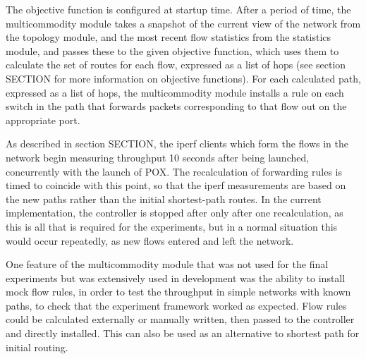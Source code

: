 The objective function is configured at startup time. After a period of time, the multicommodity module takes a snapshot of the current view of the network from the topology module, and the most recent flow statistics from the statistics module, and passes these to the given objective function, which uses them to calculate the set of routes for each flow, expressed as a list of hops (see section SECTION for more information on objective functions). For each calculated path, expressed as a list of hops, the multicommodity module installs a rule on each switch in the path that forwards packets corresponding to that flow out on the appropriate port.

As described in section SECTION, the iperf clients which form the flows in the network begin measuring throughput 10 seconds after being launched, concurrently with the launch of POX. The recalculation of forwarding rules is timed to coincide with this point, so that the iperf measurements are based on the new paths rather than the initial shortest-path routes.  In the current implementation, the controller is stopped after only after one recalculation, as this is all that is required for the experiments, but in a normal situation this would occur repeatedly, as new flows entered and left the network.

One feature of the multicommodity module that was not used for the final experiments but was extensively used in development was the ability to install mock flow rules, in order to test the throughput in simple networks with known paths, to check that the experiment framework worked as expected. Flow rules could be calculated externally or manually written, then passed to the controller and directly installed. This can also be used as an alternative to shortest path for initial routing.
